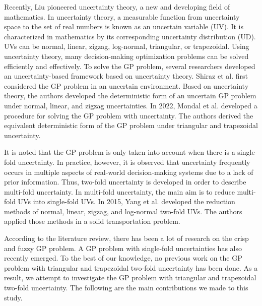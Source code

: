 \par Recently, Liu \cite{Liu 2015} pioneered uncertainty theory, a new and developing field of mathematics. In uncertainty theory, a measurable function from uncertainty space to the set of real numbers is known as an uncertain variable (UV). It is characterized in mathematics by its corresponding uncertainty distribution (UD). UVs can be normal, linear, zigzag, log-normal, triangular, or trapezoidal. Using uncertainty theory, many decision-making optimization problems can be solved efficiently and effectively. To solve the GP problem, several researchers developed an uncertainty-based framework based on uncertainty theory. Shiraz et al. \cite{Shiraz 2016} first considered the GP problem in an uncertain environment. Based on uncertainty theory, the authors developed the deterministic form of an uncertain GP problem under normal, linear, and zigzag uncertainties. In 2022, Mondal et al. \cite{Mondal 2022} developed a procedure for solving the GP problem with uncertainty. The authors derived the equivalent deterministic form of the GP problem under triangular and trapezoidal uncertainty.
\par It is noted that the GP problem is only taken into account when there is a single-fold uncertainty. In practice, however, it is observed that uncertainty frequently occurs in multiple aspects of real-world decision-making systems due to a lack of prior information. Thus, two-fold uncertainty is developed in order to describe multi-fold uncertainty. In multi-fold uncertainty, the main aim is to reduce multi-fold UVs into single-fold UVs. In 2015, Yang et al. \cite{Yang 2015} developed the reduction methods of normal, linear, zigzag, and log-normal two-fold UVs. The authors applied those methods in a solid transportation problem.
\par According to the literature review, there has been a lot of research on the crisp and fuzzy GP problem. A GP problem with single-fold uncertainties has also recently emerged. To the best of our knowledge, no previous work on the GP problem with triangular and trapezoidal two-fold uncertainty has been done. As a result, we attempt to investigate the GP problem with triangular and trapezoidal two-fold uncertainty. The following are the main contributions we made to this study.

